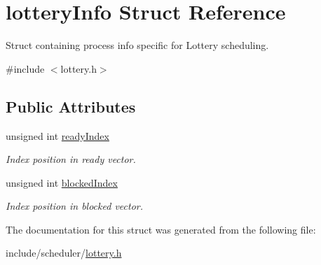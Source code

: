 \hypertarget{structlotteryInfo}{\section{lottery\-Info \-Struct \-Reference}
\label{de/d4c/structlotteryInfo}
}


\-Struct containing process info specific for \-Lottery scheduling.  




{\ttfamily \#include $<$lottery.\-h$>$}

\subsection*{\-Public \-Attributes}
\begin{DoxyCompactItemize}
\item 
\hypertarget{structlotteryInfo_a6cf8c1d3e83afcf0d0b51084f7b577b0}{unsigned int \hyperlink{structlotteryInfo_a6cf8c1d3e83afcf0d0b51084f7b577b0}{ready\-Index}}\label{de/d4c/structlotteryInfo_a6cf8c1d3e83afcf0d0b51084f7b577b0}

\begin{DoxyCompactList}\small\item\em \-Index position in ready vector. \end{DoxyCompactList}\item 
\hypertarget{structlotteryInfo_aec8e9dc093af752c056563e24275a63b}{unsigned int \hyperlink{structlotteryInfo_aec8e9dc093af752c056563e24275a63b}{blocked\-Index}}\label{de/d4c/structlotteryInfo_aec8e9dc093af752c056563e24275a63b}

\begin{DoxyCompactList}\small\item\em \-Index position in blocked vector. \end{DoxyCompactList}\end{DoxyCompactItemize}


\-The documentation for this struct was generated from the following file\-:\begin{DoxyCompactItemize}
\item 
include/scheduler/\hyperlink{lottery_8h}{lottery.\-h}\end{DoxyCompactItemize}
